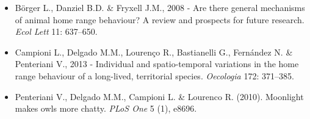 \begin{otherlanguage}{english}
\begin{itemize}
	\item B\"orger L., Danziel B.D. \& Fryxell J.M., 2008 - Are there general
mechanisms of animal home range behaviour? A review and prospects for
future research. \textit{Ecol Lett }11: 637--650.

	\item Campioni L., Delgado M.M., Louren\c{c}o R., Bastianelli G., Fern\'andez
N. \& Penteriani V., 2013 - Individual and spatio-temporal variations
in the home range behaviour of a long-lived, territorial species.
\textit{Oecologia} 172: 371--385.

	\item Penteriani V., Delgado M.M., Campioni L. \& Lourenco R. (2010).
Moonlight makes owls more chatty. \textit{PLoS One} 5 (1), e8696.
\end{itemize}
\end{otherlanguage}
